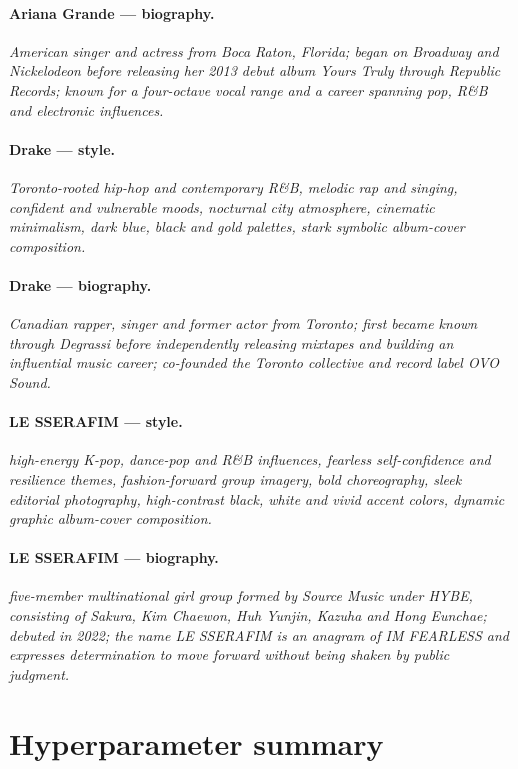 \documentclass{article}
\begin{document}
\paragraph{Ariana Grande --- biography.}
\textit{American singer and actress from Boca Raton, Florida; began on
Broadway and Nickelodeon before releasing her 2013 debut album Yours Truly
through Republic Records; known for a four-octave vocal range and a career
spanning pop, R\&B and electronic influences.}

\paragraph{Drake --- style.}
\textit{Toronto-rooted hip-hop and contemporary R\&B, melodic rap and
singing, confident and vulnerable moods, nocturnal city atmosphere,
cinematic minimalism, dark blue, black and gold palettes, stark symbolic
album-cover composition.}

\paragraph{Drake --- biography.}
\textit{Canadian rapper, singer and former actor from Toronto; first
became known through Degrassi before independently releasing mixtapes and
building an influential music career; co-founded the Toronto collective
and record label OVO Sound.}

\paragraph{LE SSERAFIM --- style.}
\textit{high-energy K-pop, dance-pop and R\&B influences, fearless
self-confidence and resilience themes, fashion-forward group imagery,
bold choreography, sleek editorial photography, high-contrast black,
white and vivid accent colors, dynamic graphic album-cover composition.}

\paragraph{LE SSERAFIM --- biography.}
\textit{five-member multinational girl group formed by Source Music under
HYBE, consisting of Sakura, Kim Chaewon, Huh Yunjin, Kazuha and Hong
Eunchae; debuted in 2022; the name LE SSERAFIM is an anagram of IM
FEARLESS and expresses determination to move forward without being shaken
by public judgment.}

\section{Hyperparameter summary}
\label{app:hyper}
\end{document}

